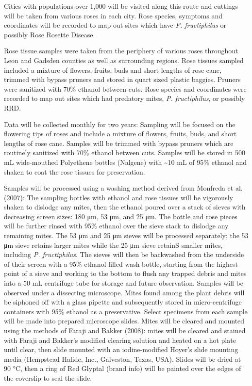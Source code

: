 \documentclass[12pt,final,CPage]{ufthesis}
\begin{document}
{  Cities with populations over 1,000 will be visited along this route and cuttings will be taken from various roses in each city. Rose species, symptoms and coordinates will be recorded to map out sites which have \emph{P. fructiphilus} or possibly Rose Rosette Disease.

  Rose tissue samples were taken from the periphery of various roses throughout Leon and Gadsden counties as well as surrounding regions. Rose tissues sampled included a mixture of flowers, fruits, buds and short lengths of rose cane, trimmed with bypass pruners and stored in quart sized plastic baggies. Pruners were sanitized with 70\% ethanol between cuts. Rose species and coordinates were recorded to map out sites which had predatory mites, \emph{P. fructiphilus}, or possibly RRD.

  Data will be collected monthly for two years:
  Sampling will be focused on the flowering tips of roses and include a mixture of flowers, fruits, buds, and short lengths of rose cane. Samples will be trimmed with bypass pruners which are routinely sanitized with 70\% ethanol between cuts. Samples will be stored in 500 mL wide-mouthed Polyethene bottles (Nalgene) with \textasciitilde10 mL of 95\% ethanol and shaken to coat the rose tissues for preservation.

  Samples will be processed using a washing method derived from Monfreda et al. (2007): The sampling bottles with ethanol and rose tissues will be vigorously shaken to dislodge any mites, then the ethanol poured over a stack of sieves with decreasing screen sizes: 180 μm, 53 μm, and 25 μm. The bottle and rose pieces will be further rinsed with 95\% ethanol over the sieve stack to dislodge any remaining mites. The 53 μm and 25 μm sieves will be processed separately; the 53 μm sieve retains larger mites while the 25 μm sieve retainS smaller mites, including \emph{P. fructiphilus}. The sieves will then be backwashed from the underside of their screen with a 95\% ethanol-filled wash bottle, starting from the highest point of a sieve and working to the bottom to flush any trapped debris and mites into a 50 mL centrifuge tube for storage and future observation. Samples will be observed under a dissecting microscope. Mites found among the plant debris will be siphoned off with a glass pipette and subsequently stored in micro-centrifuge containers with 95\% ethanol as a preservative. Select specimens from each sample will be made into prepared microscope slides. Mites will be cleared and mounted using the methods of Faraji and Bakker (2008): mites will be cleared and stained with Faraji and Bakker's modified clearing solution and heated on a hot plate until clear, then slide mounted with an iodine-modified Hoyer's slide mounting media (Hempstead Halide, Inc., Galveston, Texas, USA). Slides will be dried at 90 °C, then a ring of Red Glyptal (brand info) will be painted over the edges of the coverslip to seal the slide.

}
\end{document}
